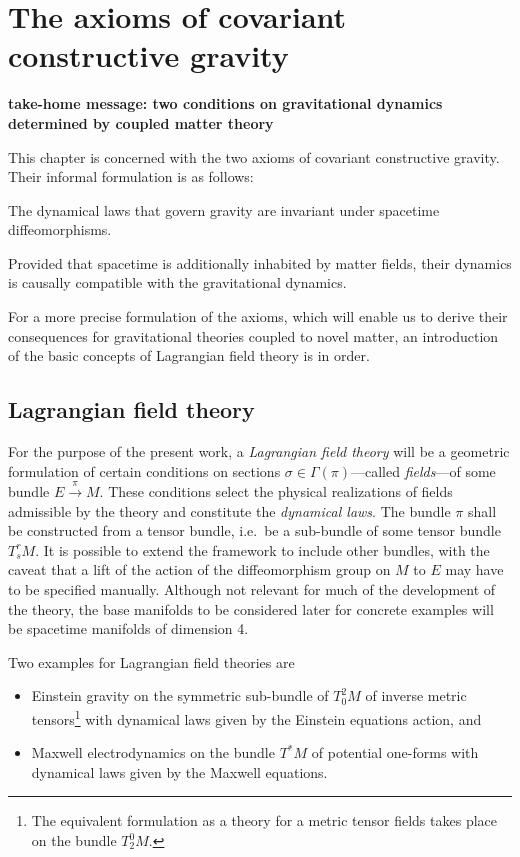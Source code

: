 \chapter{The axioms of covariant constructive gravity}

\textbf{take-home message: two conditions on gravitational dynamics determined by coupled matter theory}

This chapter is concerned with the two axioms of covariant constructive gravity. Their informal formulation is as follows:
\begin{axiom}
  The dynamical laws that govern gravity are invariant under spacetime diffeomorphisms. \cite{cgg paper}
\end{axiom}
\begin{axiom}
  Provided that spacetime is additionally inhabited by matter fields, their dynamics is causally compatible with the gravitational dynamics. \cite{cgg paper}
\end{axiom}

For a more precise formulation of the axioms, which will enable us to derive their consequences for gravitational theories coupled to novel matter, an introduction of the basic concepts of Lagrangian field theory is in order.

\section{Lagrangian field theory}
For the purpose of the present work, a \emph{Lagrangian field theory} will be a geometric formulation of certain conditions on sections $\sigma\in\Gamma(\pi)$---called \emph{fields}---of some bundle $E\overset{\pi}{\longrightarrow} M$. These conditions select the physical realizations of fields admissible by the theory and constitute the \emph{dynamical laws}. The bundle $\pi$ shall be constructed from a tensor bundle, i.e.~be a sub-bundle of some tensor bundle $T^r_sM$. It is possible to extend the framework to include other bundles, with the caveat that a lift of the action of the diffeomorphism group on $M$ to $E$ may have to be specified manually. Although not relevant for much of the development of the theory, the base manifolds to be considered later for concrete examples will be spacetime manifolds of dimension 4.

\begin{example}
  Two examples for Lagrangian field theories are
  \begin{itemize}
    \item Einstein gravity on the symmetric sub-bundle of $T^2_0M$ of inverse metric tensors\footnote{The equivalent formulation as a theory for a metric tensor fields takes place on the bundle $T^0_2M$.} with dynamical laws given by the Einstein equations action, and
    \item Maxwell electrodynamics on the bundle $T^\ast M$ of potential one-forms with dynamical laws given by the Maxwell equations.
  \end{itemize}
\end{example}

